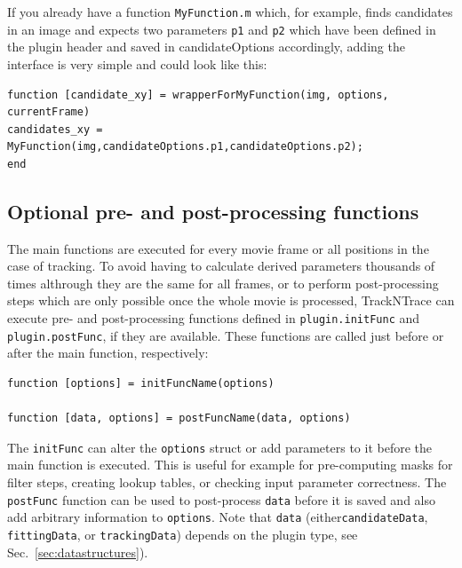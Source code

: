 \documentclass[11pt,onside]{report}
\numberwithin{equation}{chapter}
\begin{document}
If you already have a function \texttt{MyFunction.m} which, for example, finds candidates in an image and expects two parameters \texttt{p1} and \texttt{p2} which have been defined in the plugin header and saved in candidateOptions accordingly, adding the interface is very simple and could look like this:
\begin{lstlisting}[style=Matlab-editor]
function [candidate_xy] = wrapperForMyFunction(img, options, currentFrame)
candidates_xy = MyFunction(img,candidateOptions.p1,candidateOptions.p2);
end
\end{lstlisting}

\subsection{Optional pre- and post-processing functions}
The main functions are executed for every movie frame or all positions in the case of tracking. To avoid having to calculate derived parameters thousands of times althrough they are the same for all frames, or to perform post-processing steps which are only possible once the whole movie is processed, TrackNTrace can execute pre- and post-processing functions defined in \texttt{plugin.initFunc} and \texttt{plugin.postFunc}, if they are available. These functions are called just before or after the main function, respectively:
\begin{lstlisting}[style=Matlab-editor]
function [options] = initFuncName(options)

function [data, options] = postFuncName(data, options)
\end{lstlisting}
The \texttt{initFunc} can alter the \texttt{options} struct or add parameters to it before the main function is executed. This is useful for example for pre-computing masks for filter steps, creating lookup tables, or checking input parameter correctness. The \texttt{postFunc} function can be used to post-process \texttt{data} before it is saved and also add arbitrary information to \texttt{options}. Note that \texttt{data} (either\texttt{candidateData}, \texttt{fittingData}, or \texttt{trackingData}) depends on the plugin type, see Sec.~\ref{sec:datastructures}). 
\end{document}
